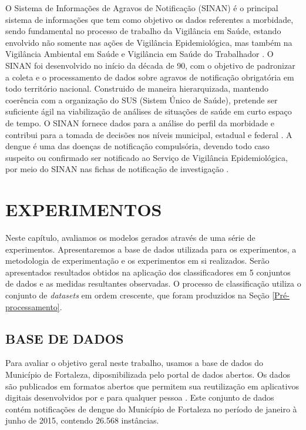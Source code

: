 \documentclass[
	12pt,				%
	openright,			%
	oneside,	
	a4paper,				%
	english,				%
	brazil				%
]{abntex2/abntex2} %
\begin{document}
	O Sistema de Informações de Agravos de Notificação (SINAN) é o principal sistema de informações que tem como objetivo os dados referentes a morbidade, sendo fundamental no processo de trabalho da Vigilância em Saúde, estando envolvido não somente nas ações de Vigilância Epidemiológica, mas também na Vigilância Ambiental em Saúde e Vigilância em Saúde do Trabalhador \cite{conass:2015}.
	O SINAN foi desenvolvido no início da década de 90, com o objetivo de padronizar a coleta e o processamento de dados sobre agravos de notificação obrigatória em todo território nacional. Construido de maneira hierarquizada, mantendo coerência com a organização do SUS (Sistem Único de Saúde), pretende ser suficiente ágil na viabilização de análises de situações de saúde em curto espaço de tempo. O SINAN fornece dados para a análise do perfil da morbidade e contribui para a tomada de decisões nos níveis municipal, estadual e federal \cite{saude:2008}.
	A dengue é uma das doenças de notificação compulsória, devendo todo caso suspeito ou confirmado ser notificado ao Serviço de Vigilância Epidemiológica, por meio do SINAN nas fichas de notificação de investigação \cite{saude:2008}.
	
	
\chapter{EXPERIMENTOS}

	Neste capítulo, avaliamos os modelos gerados através de uma série de experimentos. Apresentaremos a base de dados utilizada para os experimentos, a metodologia de experimentação e os experimentos em si realizados. Serão apresentados resultados obtidos na aplicação dos classificadores em  5  conjuntos de dados e as medidas resultantes observadas. O processo de classificação utiliza o conjunto de \textit{datasets} em ordem crescente, que foram  produzidos na Seção \ref{Pré-processamento}. %

	\section{BASE DE DADOS}
	
	Para avaliar o objetivo geral neste trabalho, usamos a base de dados  do Município de Fortaleza, diposnibilizada pelo portal de dados abertos. Os dados são publicados em formatos abertos que permitem sua reutilização  em aplicativos digitais desenvolvidos por e para qualquer pessoa \cite{fortaleza:2015}. Este conjunto de dados contém notificações de dengue do Município de Fortaleza no período de janeiro à junho de 2015, contendo 26.568 instâncias. %
	
\end{document}
